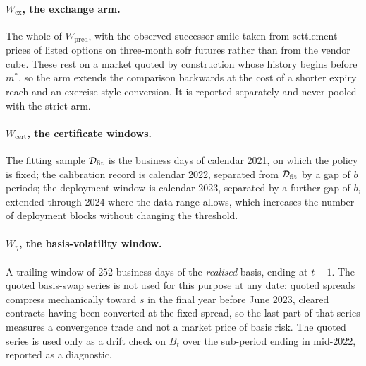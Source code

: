 \documentclass[../../../main.tex]{subfiles}
\begin{document}
\paragraph{$W_{\mathrm{ex}}$, the exchange arm.} The whole of $W_{\mathrm{pred}}$, with the observed successor smile taken from settlement prices of listed options on three-month \gls{sofr} futures rather than from the vendor cube. These rest on a market quoted by construction whose history begins before $m^*$, so the arm extends the comparison backwards at the cost of a shorter expiry reach and an exercise-style conversion. It is reported separately and never pooled with the strict arm.

\paragraph{$W_{\mathrm{cert}}$, the certificate windows.} The fitting sample $\mathcal D_{\mathrm{fit}}$ is the business days of calendar 2021, on which the policy is fixed; the calibration record is calendar 2022, separated from $\mathcal D_{\mathrm{fit}}$ by a gap of $b$ periods; the deployment window is calendar 2023, separated by a further gap of $b$, extended through 2024 where the data range allows, which increases the number of deployment blocks without changing the threshold.

\paragraph{$W_\eta$, the basis-volatility window.} A trailing window of $252$ business days of the \emph{realised} basis, ending at $t-1$. The quoted basis-swap series is not used for this purpose at any date: quoted spreads compress mechanically toward $s$ in the final year before June 2023, cleared contracts having been converted at the fixed spread, so the last part of that series measures a convergence trade and not a market price of basis risk. The quoted series is used only as a drift check on $B_t$ over the sub-period ending in mid-2022, reported as a diagnostic.

\end{document}
